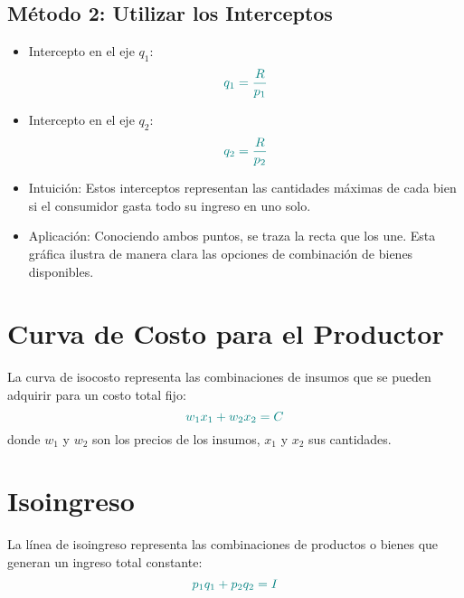 \documentclass{article}
\begin{document}
\subsection*{Método 2: Utilizar los Interceptos}
\begin{itemize}
    \item Intercepto en el eje \( q_1 \):
    \begin{equation*}
    {\color{teal}q_1 = \frac{R}{p_1}}
    \end{equation*}
    \item Intercepto en el eje \( q_2 \):
    \begin{equation*}
    {\color{teal}q_2 = \frac{R}{p_2}}
    \end{equation*}
\end{itemize}
\begin{itemize}
    \item Intuición: Estos interceptos representan las {\color{teal}cantidades máximas} de cada bien si el consumidor gasta todo su ingreso en uno solo.
    \item Aplicación: Conociendo ambos puntos, se traza la recta que los une. Esta gráfica ilustra de manera clara las {\color{teal}opciones de combinación} de bienes disponibles.
\end{itemize}

\section*{Curva de Costo para el Productor}

La {\color{teal}curva de isocosto} representa las combinaciones de insumos que se pueden adquirir para un {\color{teal}costo total fijo}:
\begin{equation*}
{\color{teal}w_1 x_1 + w_2 x_2 = C}
\end{equation*}
donde \(w_1\) y \(w_2\) son los precios de los insumos, \(x_1\) y \(x_2\) sus cantidades. 


\section*{Isoingreso}

La {\color{teal}línea de isoingreso} representa las combinaciones de productos o bienes que generan un {\color{teal}ingreso total constante}:
\begin{equation*}
{\color{teal}p_1 q_1 + p_2 q_2 = I}
\end{equation*}
\end{document}
